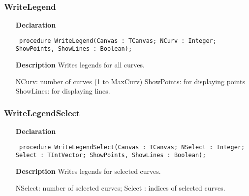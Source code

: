 \documentclass[12pt,a4paper,oneside]{report}
\newcommand{\declarationitem}[1]{\textbf{#1}}
\newcommand{\descriptiontitle}[1]{\textbf{#1}}
\newcommand{\code}[1]{\texttt{#1}}
\begin{document}
\subsubsection{WriteLegend}
\label{uwinplot-WriteLegend}
\begin{itemize}\item[\declarationitem{Declaration}\hfill]
	\begin{flushleft}
		\code{
			procedure WriteLegend(Canvas : TCanvas; NCurv : Integer; ShowPoints, ShowLines : Boolean);}
		
	\end{flushleft}
	
	\par
	\item[\descriptiontitle{Description}]
	Writes legends for all curves.
	
	NCurv: number of curves (1 to MaxCurv) ShowPoints: for displaying points ShowLines: for displaying lines.
	
\end{itemize}
\subsubsection{WriteLegendSelect}
\label{uwinplot-WriteLegendSelect}
\begin{itemize}\item[\declarationitem{Declaration}\hfill]
	\begin{flushleft}
		\code{
			procedure WriteLegendSelect(Canvas : TCanvas; NSelect : Integer; Select : TIntVector; ShowPoints, ShowLines : Boolean);}
		
	\end{flushleft}
	
	\par
	\item[\descriptiontitle{Description}]
	Writes legends for selected curves.
	
	NSelect: number of selected curves; Select : indices of selected curves.
	
\end{itemize}
\end{document}
